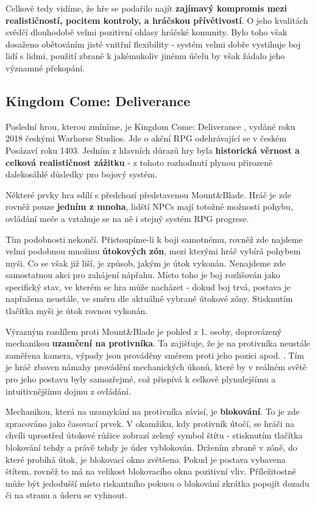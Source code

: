 Celkově tedy vidíme, že hře se podařilo najít \textbf{zajímavý kompromis mezi realističností, pocitem kontroly, a hráčskou přívětivostí}. O jeho kvalitách svědčí dlouhodobě velmi pozitivní ohlasy hráčské komunity. Bylo toho však dosaženo obětováním jisté vnitřní flexibility - systém velmi dobře vystihuje boj lidí s lidmi, použití zbraně k jakémukoliv jinému účelu by však žádalo jeho významné překopání. 


\subsection{Kingdom Come: Deliverance}
Poslední hrou, kterou zmíníme, je Kingdom Come: Deliverance \cite{KCD}, vydáné roku 2018 českými Warhorse Studios. Jde o akční \acs{RPG} odehrávající se v českém Posázaví roku 1403. Jedním z hlavních důrazů hry byla \textbf{historická věrnost a celková realističnost zážitku} - z tohoto rozhodnutí plynou přirozeně dalekosáhlé důsledky pro bojový systém.

Některé prvky hra sdílí s předchozí představenou Mount\&Blade. Hráč je zde rovněž pouze \textbf{jedním z mnoha}, lidští \acs{NPC}s mají totožné možnosti pohybu, ovládání meče a vztahuje se na ně i stejný systém RPG progrese.

Tím podobnosti nekončí. Přistoupíme-li k boji samotnému, rovněž zde najdeme velmi podobnou množinu \textbf{útokových zón}, mezi kterými hráč vybírá pohybem myši. Co se však již liší, je způsob, jakým je útok vykonán. Nenajdeme zde samostatnou akci pro zahájení nápřahu. Místo toho je boj rozlišován jako specifický stav, ve kterém se hra může nacházet - dokud boj trvá, postava je napřažena neustále, ve směru dle aktuálně vybrané útokové zóny. Stisknutím tlačítka myši je útok rovnou vykonán. 

Výrazným rozdílem proti Mount\&Blade je pohled z 1. osoby, doprovázený mechanikou \textbf{uzamčení na protivníka}. Ta zajišťuje, že je na protivníka neustále zaměřena kamera, výpady jsou prováděny směrem proti jeho pozici apod. . Tím je hráč zbaven námahy provádění mechanických úkonů, které by v reálném světě pro jeho postavu byly samozřejmé, což přispívá k celkově plynulejšímu a intuitivnějšímu dojmu z ovládání. 

Mechanikou, která na uzamykání na protivníka závisí, je \textbf{blokování}. To je zde zpracováno jako časovací prvek. V okamžiku, kdy protivník útočí, se hráči na chvíli uprostřed útokové růžice zobrazí zelený symbol štítu - stisknutím tlačítka blokování tehdy a právě tehdy je úder vyblokován. Držením zbraně v zóně, do které probíhá útok, je blokovací okno zvětšeno. Pokud je postava vybavena štítem, rovněž to má na velikost blokovacího okna pozitivní vliv. Příležitostně může být jedodušší místo riskantního pokusu o blokování zkrátka popojít dozadu či na stranu a úderu se vyhnout. 

